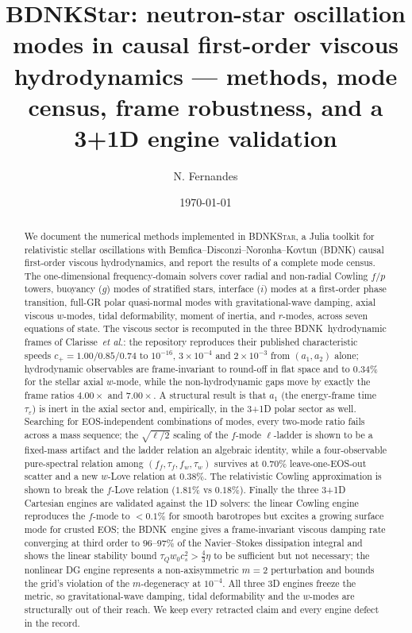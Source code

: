 \documentclass[aps,prd,preprint,amsmath,amssymb,nofootinbib,longbibliography]{revtex4-2}
\newcommand{\BDNK}{BDNK}
\begin{document}
\title{BDNKStar: neutron-star oscillation modes in causal first-order viscous hydrodynamics ---
methods, mode census, frame robustness, and a 3+1D engine validation}

\author{N. Fernandes}

\date{\today}

\begin{abstract}
We document the numerical methods implemented in \textsc{BDNKStar}, a Julia toolkit for
relativistic stellar oscillations with Bemfica--Disconzi--Noronha--Kovtun (\BDNK) causal
first-order viscous hydrodynamics, and report the results of a complete mode census. The
one-dimensional frequency-domain solvers cover radial and non-radial Cowling $f/p$ towers,
buoyancy ($g$) modes of stratified stars, interface ($i$) modes at a first-order phase
transition, full-GR polar quasi-normal modes with gravitational-wave damping, axial viscous
$w$-modes, tidal deformability, moment of inertia, and $r$-modes, across seven equations of
state. The viscous sector is recomputed in the three \BDNK\ hydrodynamic frames of
Clarisse~\emph{et al.}: the repository reproduces their published characteristic speeds
$c_+ = 1.00/0.85/0.74$ to $10^{-16}$, $3\times10^{-4}$ and $2\times10^{-3}$ from $(a_1,a_2)$
alone; hydrodynamic observables are frame-invariant to round-off in flat space and to $0.34\%$
for the stellar axial $w$-mode, while the non-hydrodynamic gaps move by exactly the frame ratios
$4.00\times$ and $7.00\times$. A structural result is that $a_1$ (the energy-frame time
$\tau_\varepsilon$) is inert in the axial sector and, empirically, in the 3+1D polar sector as
well. Searching for EOS-independent combinations of modes, every two-mode ratio fails across a
mass sequence; the $\sqrt{\ell/2}$ scaling of the $f$-mode $\ell$-ladder is shown to be a
fixed-mass artifact and the ladder relation an algebraic identity, while a four-observable
pure-spectral relation among $(f_f,\tau_f,f_w,\tau_w)$ survives at $0.70\%$ leave-one-EOS-out
scatter and a new $w$-Love relation at $0.38\%$. The relativistic Cowling approximation is shown
to break the $f$-Love relation ($1.81\%$ vs $0.18\%$). Finally the three 3+1D Cartesian engines
are validated against the 1D solvers: the linear Cowling engine reproduces the $f$-mode to
$<0.1\%$ for smooth barotropes but excites a growing surface mode for crusted EOS; the \BDNK\
engine gives a frame-invariant viscous damping rate converging at third order to $96$--$97\%$
of the Navier--Stokes dissipation integral and shows the linear stability bound
$\tau_Q w_0 c_s^2 > \tfrac43\eta$ to be sufficient but not necessary; the nonlinear DG engine
represents a non-axisymmetric $m=2$ perturbation and bounds the grid's violation of the
$m$-degeneracy at $10^{-4}$. All three 3D engines freeze the metric, so gravitational-wave
damping, tidal deformability and the $w$-modes are structurally out of their reach. We keep
every retracted claim and every engine defect in the record.
\end{abstract}
\end{document}

